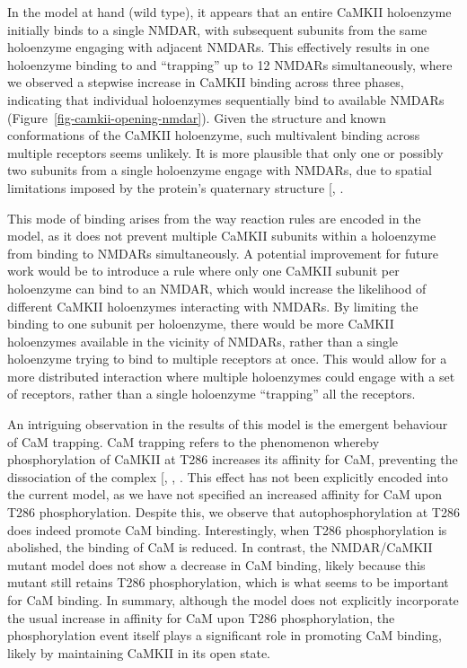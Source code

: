 \documentclass[
  11pt,
  letterpaper,
]{scrreprt}
\begin{document}
In the model at hand (wild type), it appears that an entire CaMKII
holoenzyme initially binds to a single NMDAR, with subsequent subunits
from the same holoenzyme engaging with adjacent NMDARs. This effectively
results in one holoenzyme binding to and ``trapping'' up to 12 NMDARs
simultaneously, where we observed a stepwise increase in CaMKII binding
across three phases, indicating that individual holoenzymes sequentially
bind to available NMDARs (Figure~\ref{fig-camkii-opening-nmdar}). Given
the structure and known conformations of the CaMKII holoenzyme, such
multivalent binding across multiple receptors seems unlikely. It is more
plausible that only one or possibly two subunits from a single
holoenzyme engage with NMDARs, due to spatial limitations imposed by the
protein's quaternary structure
{[},
\citeproc{ref-ozden2022CaMKII}{169}{]}.

This mode of binding arises from the way reaction rules are encoded in
the model, as it does not prevent multiple CaMKII subunits within a
holoenzyme from binding to NMDARs simultaneously. A potential
improvement for future work would be to introduce a rule where only one
CaMKII subunit per holoenzyme can bind to an NMDAR, which would increase
the likelihood of different CaMKII holoenzymes interacting with NMDARs.
By limiting the binding to one subunit per holoenzyme, there would be
more CaMKII holoenzymes available in the vicinity of NMDARs, rather than
a single holoenzyme trying to bind to multiple receptors at once. This
would allow for a more distributed interaction where multiple
holoenzymes could engage with a set of receptors, rather than a single
holoenzyme ``trapping'' all the receptors.

An intriguing observation in the results of this model is the emergent
behaviour of CaM trapping. CaM trapping refers to the phenomenon whereby
phosphorylation of CaMKII at T286 increases its affinity for CaM,
preventing the dissociation of the complex
{[},
,
\citeproc{ref-goodell2017DAPK1}{222}{]}. This effect has not been
explicitly encoded into the current model, as we have not specified an
increased affinity for CaM upon T286 phosphorylation. Despite this, we
observe that autophosphorylation at T286 does indeed promote CaM
binding. Interestingly, when T286 phosphorylation is abolished, the
binding of CaM is reduced. In contrast, the NMDAR/CaMKII mutant model
does not show a decrease in CaM binding, likely because this mutant
still retains T286 phosphorylation, which is what seems to be important
for CaM binding. In summary, although the model does not explicitly
incorporate the usual increase in affinity for CaM upon T286
phosphorylation, the phosphorylation event itself plays a significant
role in promoting CaM binding, likely by maintaining CaMKII in its open
state.
\end{document}
